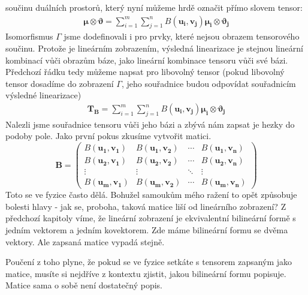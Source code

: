 \documentclass[a5paper,12pt]{amsbook}
\theoremstyle{definition}
\newcommand{\myvec}[1]{\bm{#1}}
\newcommand{\mymatrix}[1]{\mathbf{#1}}
\begin{document}
součinu duálních prostorů, který nyní můžeme hrdě označit přímo slovem tensor:
\begin{equation*}
\begin{split}
\myvec{\mu}\otimes\myvec{\vartheta} 
  = \sum_{i=1}^{m}\sum_{j=1}^{n}B(\myvec{u_i}, \myvec{v_j})\myvec{\mu_i}\otimes\myvec{\vartheta_j}
\end{split}
\end{equation*}
Isomorfismus $\Gamma$ jsme dodefinovali i pro prvky, které nejsou obrazem tensorového
součinu. Protože je lineárním zobrazením, výsledná linearizace je stejnou lineární
kombinací vůči obrazům báze, jako lineární kombinace tensoru vůči své bázi. Předchozí
řádku tedy můžeme napsat pro libovolný tensor (pokud libovolný tensor dosadíme
do zobrazení $\Gamma$, jeho souřadnice budou odpovídat souřadnicím výsledné linearizace)
\begin{equation*}
\begin{split}
\myvec{T_B} = \sum_{i=1}^{m}\sum_{j=1}^{n}B(\myvec{u_i}, \myvec{v_j})\myvec{\mu_i}\otimes\myvec{\vartheta_j}
\end{split}
\end{equation*}
Nalezli jsme souřadnice tensoru vůči jeho bázi a zbývá nám zapsat je hezky do podoby pole. Jako první
pokus zkusíme vytvořit matici.
\begin{equation*}
\mymatrix{B} = 
\left(\begin{array}{cccc}
  B(\myvec{u_1}, \myvec{v_1}) & B(\myvec{u_1}, \myvec{v_2}) & \cdots & B(\myvec{u_1}, \myvec{v_n}) \\
  B(\myvec{u_2}, \myvec{v_1}) & B(\myvec{u_2}, \myvec{v_2}) & \cdots & B(\myvec{u_2}, \myvec{v_n}) \\
  \vdots & \vdots & \ddots & \vdots \\
  B(\myvec{u_m}, \myvec{v_1}) & B(\myvec{u_m}, \myvec{v_2}) & \cdots & B(\myvec{u_m}, \myvec{v_n})
\end{array}\right)
\end{equation*}
Toto se ve fyzice často dělá. Bohužel samoukům mého ražení to opět způsobuje bolesti hlavy - jak se,
proboha, taková matice liší od lineárního zobrazení? Z předchozí kapitoly víme, že lineární
zobrazení je ekvivalentní bilineární formě s jedním vektorem a jedním kovektorem. Zde máme
bilineární formu se dvěma vektory. Ale zapsaná matice vypadá stejně.

Poučení z toho plyne, že pokud se ve fyzice setkáte s tensorem zapsaným jako matice, musíte si
nejdříve z kontextu zjistit, jakou bilineární formu popisuje. Matice sama o sobě není dostatečný
popis.
\end{document}
